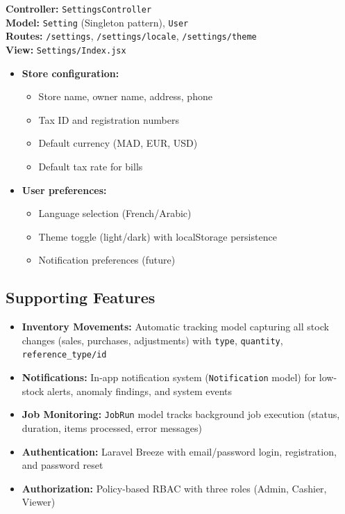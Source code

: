 \textbf{Controller:} \texttt{SettingsController}\\
\textbf{Model:} \texttt{Setting} (Singleton pattern), \texttt{User}\\
\textbf{Routes:} \texttt{/settings}, \texttt{/settings/locale}, \texttt{/settings/theme}\\
\textbf{View:} \texttt{Settings/Index.jsx}

\begin{itemize}
    \item \textbf{Store configuration:}
    \begin{itemize}
        \item Store name, owner name, address, phone
        \item Tax ID and registration numbers
        \item Default currency (MAD, EUR, USD)
        \item Default tax rate for bills
    \end{itemize}
    \item \textbf{User preferences:}
    \begin{itemize}
        \item Language selection (French/Arabic)
        \item Theme toggle (light/dark) with localStorage persistence
        \item Notification preferences (future)
    \end{itemize}
\end{itemize}

\subsection{Supporting Features}

\begin{itemize}
    \item \textbf{Inventory Movements:} Automatic tracking model capturing all stock changes (sales, purchases, adjustments) with \texttt{type}, \texttt{quantity}, \texttt{reference\_type/id}
    \item \textbf{Notifications:} In-app notification system (\texttt{Notification} model) for low-stock alerts, anomaly findings, and system events
    \item \textbf{Job Monitoring:} \texttt{JobRun} model tracks background job execution (status, duration, items processed, error messages)
    \item \textbf{Authentication:} Laravel Breeze with email/password login, registration, and password reset
    \item \textbf{Authorization:} Policy-based RBAC with three roles (Admin, Cashier, Viewer)
\end{itemize}
